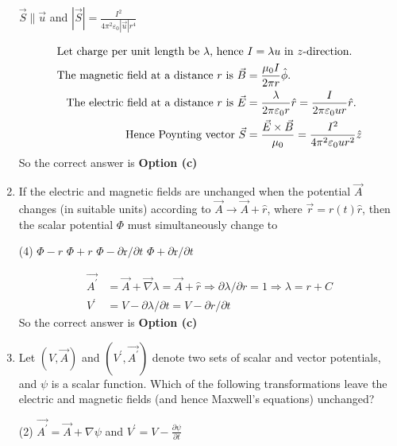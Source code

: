 \begin{enumerate}
\begin{tasks}
		\task[\textbf{d.}] $\vec{S} \| \vec{u}$ and $|\vec{S}|=\frac{I^{2}}{4 \pi^{2} \varepsilon_{0}|\vec{u}| r^{4}}$
	\end{tasks}
\begin{answer}
	\begin{align*}
	\intertext{Let charge per unit length be $\lambda$, hence $I=\lambda u$ in $z$-direction.}
	\text{The magnetic field at a distance $r$ is }\vec{B}&=\frac{\mu_{0} I}{2 \pi r} \hat{\phi}.\\
	\text{The electric field at a distance $r$ is }\vec{E}&=\frac{\lambda}{2 \pi \varepsilon_{0} r} \hat{r}=\frac{I}{2 \pi \varepsilon_{0} u r} \hat{r}.\\
	\text{Hence Poynting vector }\vec{S}&=\frac{\vec{E} \times \vec{B}}{\mu_{0}}=\frac{I^{2}}{4 \pi^{2} \varepsilon_{0} u r^{2}} \hat{z}
	\end{align*}
	So the correct answer is \textbf{Option (c)}
\end{answer}
	\item
	 If the electric and magnetic fields are unchanged when the potential $\vec{A}$ changes (in suitable units) according to $\vec{A} \rightarrow \vec{A}+\hat{r}$, where $\vec{r}=r(t) \hat{r}$, then the scalar potential $\Phi$ must simultaneously change to
	{	}
	\begin{tasks}(4)
		\task[\textbf{a.}] $\Phi-r$
		\task[\textbf{b.}] $\Phi+r$
		\task[\textbf{c.}] $\Phi-\partial \mathrm{r} / \partial t$
		\task[\textbf{d.}] $\Phi+\partial \mathrm{r} / \partial t$
	\end{tasks}
\begin{answer}
	\begin{align*}
	\overrightarrow{A^{\prime}}&=\vec{A}+\vec{\nabla} \lambda=\vec{A}+\hat{r} \Rightarrow \partial \lambda / \partial r=1 \Rightarrow \lambda=r+C\\
	V^{\prime}&=V-\partial \lambda / \partial t=V-\partial r / \partial t
	\end{align*}
	So the correct answer is \textbf{Option (c)}
\end{answer}
	\item
	 Let $(V, \vec{A})$ and $\left(V^{\prime}, \overrightarrow{A^{\prime}}\right)$ denote two sets of scalar and vector potentials, and $\psi$ is a scalar function. Which of the following transformations leave the electric and magnetic fields (and hence Maxwell's equations) unchanged?
	{}
	\begin{tasks}(2)
		\task[\textbf{a.}] $\overrightarrow{A^{\prime}}=\vec{A}+\nabla \psi$ and $V^{\prime}=V-\frac{\partial \psi}{\partial t}$

\end{tasks}
\end{enumerate}
